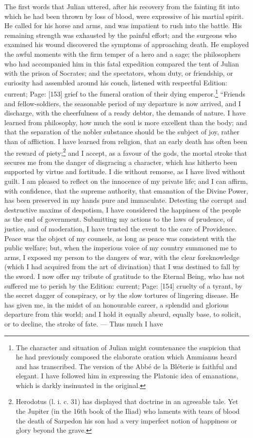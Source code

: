 The first words that Julian uttered, after his recovery from the fainting fit into which he had been thrown by loss of blood, were expressive of his martial spirit. He called for his horse and arms, and was impatient to rush into the battle. His remaining strength was exhausted by the painful effort; and the surgeons who examined his wound discovered the symptoms of approaching death. He employed the awful moments with the firm temper of a hero and a sage; the philosophers who had accompanied him in this fatal expedition compared the tent of Julian with the prison of Socrates; and the spectators, whom duty, or friendship, or curiosity had assembled around his couch, listened with respectful Edition: current; Page: [153] grief to the funeral oration of their dying emperor.\footnote{The character and situation of Julian might countenance the suspicion that he had previously composed the elaborate oration which Ammianus heard and has transcribed. The version of the Abbé de la Bléterie is faithful and elegant. I have followed him in expressing the Platonic idea of emanations, which is darkly insinuated in the original.} \texthebrew{“}Friends and fellow-soldiers, the seasonable period of my departure is now arrived, and I discharge, with the cheerfulness of a ready debtor, the demands of nature. I have learned from philosophy, how much the soul is more excellent than the body; and that the separation of the nobler substance should be the subject of joy, rather than of affliction. I have learned from religion, that an early death has often been the reward of piety;\footnote{Herodotus (l. i. c. 31) has displayed that doctrine in an agreeable tale. Yet the Jupiter (in the 16th book of the Iliad) who laments with tears of blood the death of Sarpedon his son had a very imperfect notion of happiness or glory beyond the grave.} and I accept, as a favour of the gods, the mortal stroke that secures me from the danger of disgracing a character, which has hitherto been supported by virtue and fortitude. I die without remorse, as I have lived without guilt. I am pleased to reflect on the innocence of my private life; and I can affirm, with confidence, that the supreme authority, that emanation of the Divine Power, has been preserved in my hands pure and immaculate. Detesting the corrupt and destructive maxims of despotism, I have considered the happiness of the people as the end of government. Submitting my actions to the laws of prudence, of justice, and of moderation, I have trusted the event to the care of Providence. Peace was the object of my counsels, as long as peace was consistent with the public welfare; but, when the imperious voice of my country summoned me to arms, I exposed my person to the dangers of war, with the clear foreknowledge (which I had acquired from the art of divination) that I was destined to fall by the sword. I now offer my tribute of gratitude to the Eternal Being, who has not suffered me to perish by the Edition: current; Page: [154] cruelty of a tyrant, by the secret dagger of conspiracy, or by the slow tortures of lingering disease. He has given me, in the midst of an honourable career, a splendid and glorious departure from this world; and I hold it equally absurd, equally base, to solicit, or to decline, the stroke of fate. \texthebrew{—} Thus much I have 